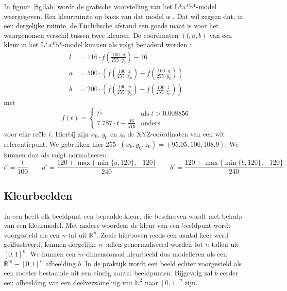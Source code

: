 In figuur~\ref{fig:lab} wordt de grafische voorstelling van het L*a*b*-model weergegeven. 
Een kleurruimte op basis van dat model is  
\cite{sharma:digital_color_imaging}. Dat wil zeggen dat, in een dergelijke 
ruimte, de Euclidische afstand een goede maat is voor het waargenomen verschil 
tussen twee kleuren. De co\"ordinaten $(l,a,b)$ van een kleur in het 
L*a*b*-model kunnen als volgt benaderd worden
\cite{debaets:similariteitsmaten_voor_kleurbeelden, philips:beeldverwerking}:
\begin{align*}
l & = 116 \cdot f({\scriptstyle\frac{100 \cdot y}{255 \cdot y_0}}) - 16 \\[2pt] 
a & = 500 \cdot \left(f({\scriptstyle\frac{\scriptstyle 100 \cdot x}{\scriptstyle 255 \cdot x_0}}) - f({\scriptstyle\frac{\scriptstyle 100 \cdot y}{\scriptstyle 255 \cdot y_0}})\right) \\[2pt] 
b & = 200 \cdot \left(f({\scriptstyle\frac{\scriptstyle 100 \cdot y}{\scriptstyle 255 \cdot y_0}}) - f({\scriptstyle\frac{\scriptstyle 100 \cdot z}{\scriptstyle 255 \cdot z_0}})\right)
\end{align*}
met
\begin{displaymath}
f(t) = \begin{cases} 
t^\frac{1}{3} & \textrm{als } t > 0.008856 \\ 
7.787 \cdot t + \frac{16}{116} & \textrm{anders}
\end{cases}
\end{displaymath}
voor elke re\"ele $t$. Hierbij zijn $x_0$, $y_0$ en $z_0$ de
XYZ-co\"ordinaten van een wit referentiepunt. We gebruiken hier 
$255 \cdot (x_0,y_0,z_0)=(95.05,100,108.9)$.
We kunnen dan als volgt normaliseren:
\begin{displaymath}
l' = \frac{l}{100} \qquad a' = \frac{120 + 
\max\{\min\{a,120\},-120\}}{240} \qquad b' = \frac{120 + \max\{\min\{b,120\},-120\}}{240}
\end{displaymath}


\subsection{Kleurbeelden}

In een  heeft elk beeldpunt een bepaalde kleur, die beschreven wordt met
behulp van een kleurmodel. Met andere woorden: de kleur van een beeldpunt wordt voorgesteld 
als een $n$-tal uit
$\mathbb{R}^n$. Zoals hierboven reeds een aantal keer werd ge\"illustreerd, kunnen dergelijke 
$n$-tallen genormaliseerd worden tot $n$-tallen uit $[0,1]^n$. We kunnen een $m$-dimensionaal 
kleurbeeld dus modelleren als een $\mathbb{R}^m - [0,1]^n$ afbeelding $b$. 
In de praktijk wordt een beeld echter voorgesteld als een rooster bestaande uit een
eindig aantal beeldpunten. Bijgevolg zal $b$ eerder een afbeelding van een deelverzameling van 
$\mathbb{N}^2$ naar $[0,1]^n$ zijn. 

